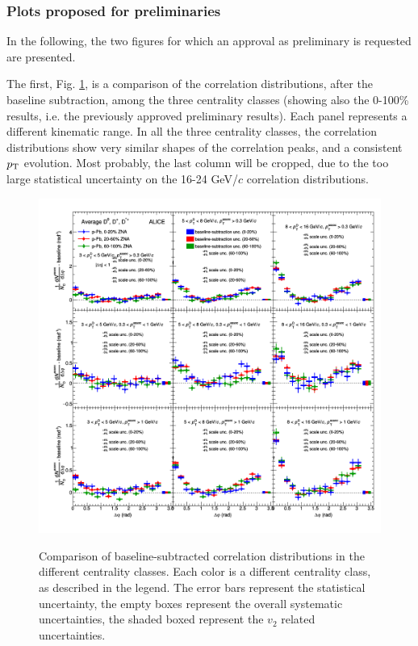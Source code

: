 \subsubsection{Plots proposed for preliminaries}
In the following, the two figures for which an approval as preliminary is requested are presented.

The first, Fig. \ref{fig:prel1}, is a comparison of the correlation distributions, after the baseline subtraction, among the three centrality classes (showing also the 0-100\% results, i.e. the previously approved preliminary results). Each panel represents a different kinematic range. In all the three centrality classes, the correlation distributions show very similar shapes of the correlation peaks, and a consistent $p_{\rm T}$ evolution. Most probably, the last column will be cropped, due to the too large statistical uncertainty on the 16-24 GeV/$c$ correlation distributions.

\begin{figure}
\centering
{\includegraphics[width=0.95\linewidth]{figuresVsCent/Averages/Trends/plotComparison_WeightedAverage_pp_pPb_UniqueCanvas_Style1_FinalQM.png}}
 \caption{Comparison of baseline-subtracted correlation distributions in the different centrality classes. Each color is a different centrality class, as described in the legend. The error bars represent the statistical uncertainty, the empty boxes represent the overall systematic uncertainties, the shaded boxed represent the $v_2$ related uncertainties.}
\label{fig:prel1}
\end{figure}

